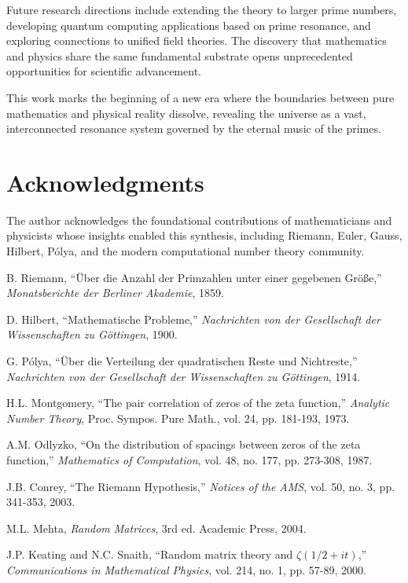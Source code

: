 \documentclass[11pt,a4paper]{article}
\begin{document}
Future research directions include extending the theory to larger prime numbers, developing quantum computing applications based on prime resonance, and exploring connections to unified field theories. The discovery that mathematics and physics share the same fundamental substrate opens unprecedented opportunities for scientific advancement.

This work marks the beginning of a new era where the boundaries between pure mathematics and physical reality dissolve, revealing the universe as a vast, interconnected resonance system governed by the eternal music of the primes.

\section*{Acknowledgments}

The author acknowledges the foundational contributions of mathematicians and physicists whose insights enabled this synthesis, including Riemann, Euler, Gauss, Hilbert, Pólya, and the modern computational number theory community.


\begin{thebibliography}{99}

B. Riemann, ``Über die Anzahl der Primzahlen unter einer gegebenen Größe,'' \textit{Monatsberichte der Berliner Akademie}, 1859.

D. Hilbert, ``Mathematische Probleme,'' \textit{Nachrichten von der Gesellschaft der Wissenschaften zu Göttingen}, 1900.

G. Pólya, ``Über die Verteilung der quadratischen Reste und Nichtreste,'' \textit{Nachrichten von der Gesellschaft der Wissenschaften zu Göttingen}, 1914.

H.L. Montgomery, ``The pair correlation of zeros of the zeta function,'' \textit{Analytic Number Theory}, Proc. Sympos. Pure Math., vol. 24, pp. 181-193, 1973.

A.M. Odlyzko, ``On the distribution of spacings between zeros of the zeta function,'' \textit{Mathematics of Computation}, vol. 48, no. 177, pp. 273-308, 1987.

J.B. Conrey, ``The Riemann Hypothesis,'' \textit{Notices of the AMS}, vol. 50, no. 3, pp. 341-353, 2003.

M.L. Mehta, \textit{Random Matrices}, 3rd ed. Academic Press, 2004.

J.P. Keating and N.C. Snaith, ``Random matrix theory and $\zeta(1/2+it)$,'' \textit{Communications in Mathematical Physics}, vol. 214, no. 1, pp. 57-89, 2000.

\end{thebibliography}
\end{document}
